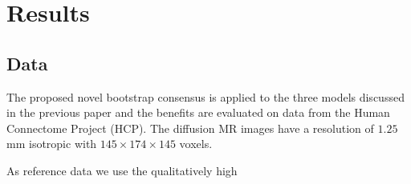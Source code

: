 \section{Results}
\subsection{Data}
The proposed novel bootstrap consensus is applied to the three models discussed
in the previous paper and the benefits are evaluated on data from the Human
Connectome Project (HCP). The diffusion MR images have a resolution of $1.25$ mm
isotropic with $145 \times 174 \times 145$ voxels. 

As reference data we use the qualitatively high 
